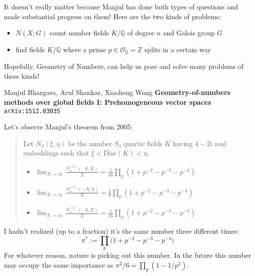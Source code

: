\documentclass[12pt]{article}
\begin{document}
It doesn't really matter because Manjul has done both types of questions and made substantial progress on them! Here are the two kinds of problems:
\begin{itemize}
\item $N(X; G)$ count number fields $K/\mathbb{Q}$ of degree $n$ and Galois group $G$ 
\item find fields $K/\mathbb{Q}$ where a prime $p \in \mathcal{O}_\mathbb{Q} = \mathbb{Z}$ splits in a certain way
\end{itemize}
Hopefully, {\color{green!50!orange} Geometry of Numbers}, can help us pose and solve many problems of these kinds!

\vfill

\begin{thebibliography}{}
\item Manjul Bhargava, Arul Shankar, Xiaoheng Wang \textbf{Geometry-of-numbers methods over global fields I: Prehomogeneous vector spaces} \texttt{arXiv:1512.03035}
\end{thebibliography}

\newpage

\noindent Let's observe Manjul's theorem from 2005:
\begin{quotation}
Let $N_4(\xi, \eta)$ be the number $S_4$ quartic fields $K$ having $4-2i$ real embeddings such that $\xi < \mathrm{Disc}(K) < \eta$.
\begin{itemize}
\item $\displaystyle \lim_{X \to \infty} \frac{N_4^{(0)}(\;\;\,0,X)}{X}=
\frac{1}{48}\prod_p (1 + p^{-2} - p^{-3} - p^{-4})$
\item $\displaystyle \lim_{X \to \infty} \frac{N_4^{(1)}(-X,0)}{X}=
\frac{1}{8} \prod_p(1 + p^{-2} - p^{-3} - p^{-4})$
\item $\displaystyle \lim_{X \to \infty} \frac{N_4^{(2)}(\;\;\,0,X)}{X}=
\frac{1}{16} \prod_p (1 + p^{-2} - p^{-3} - p^{-4}) $
\end{itemize}
\end{quotation}
I hadn't realized (up to a fraction) it's the same number three different times:
$$ \pi^* := \prod_p \Big(1 + p^{-2} - p^{-3} - p^{-4} \Big)$$ 
For whatever reason, nature is picking out this number.  In the future this number may occupy the same importance as $\pi^2/6 = \prod_p (1 - 1/p^2)$.
\end{document}
